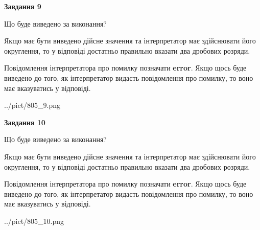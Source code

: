 \documentclass[12pt, ukrainian]{article}
\begin{document}
{\begin {Large}
{\begin {center}\textbf{Завдання 9}\end {center}}\par
Що буде виведено за виконання? \par

Якщо має бути виведено дійсне значення та інтерпретатор має здійснювати його округлення, 
то у відповіді достатньо правильно вказати два дробових розряди.

Повідомлення інтерпретатора про помилку позначати \textbf{error}.
Якщо щось буде виведено до того, як інтерпретатор видасть повідомлення про помилку, 
то воно має вказуватись у відповіді. \par

\begin{center}
	{../pict/805_9.png}
\end{center}
\newpage

{\begin {center}\textbf{Завдання 10}\end {center}}\par
Що буде виведено за виконання? \par

Якщо має бути виведено дійсне значення та інтерпретатор має здійснювати його округлення, 
то у відповіді достатньо правильно вказати два дробових розряди.

Повідомлення інтерпретатора про помилку позначати \textbf{error}.
Якщо щось буде виведено до того, як інтерпретатор видасть повідомлення про помилку, 
то воно має вказуватись у відповіді. \par

\begin{center}
	{../pict/805_10.png}
\end{center}
\newpage

\end {Large}}
\end{document}

